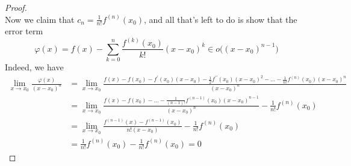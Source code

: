 \begin{proof}
\begin{equation}
    \end{equation}
    Now we claim that $c_n = \frac{1}{n!} f^{(n)} (x_0)$, and all that's left to do is show that the error term 
    \begin{equation}
      \varphi(x) = f(x) - \sum_{k=0}^{n} \frac{f^{(k)} (x_0)}{k!} (x - x_0)^k \in o \big( (x - x_0)^{n-1} \big)
    \end{equation}
    Indeed, we have 
    \begin{align}
      \lim_{x \to x_0} \frac{\varphi(x)}{(x - x_0)^n} & = \lim_{x \to x_0} \frac{f(x) - f(x_0) - f^\prime (x_0) (x - x_0) - \frac{1}{2} f^{\prime\prime} (x_0) (x - x_0)^2 - \ldots - \frac{1}{n!} f^{(n)} (x_0) (x - x_0)^n}{(x - x_0)^n}  \\ 
                                                      & = \lim_{x \to x_0} \frac{f(x) - f(x_0) - \ldots - \frac{1}{(n-1)!} f^{(n-1)} (x_0) (x - x_0)^{n-1}}{(x - x_0)^n} - \frac{1}{n!} f^{(n)} (x_0) \\ 
                                                      & = \lim_{x \to x_0} \frac{f^{(n-1)} (x) - f^{(n-1)} (x_0)}{n! (x - x_0)} - \frac{1}{n!} f^{(n)} (x_0) \\ 
                                                      & = \frac{1}{n!} f^{(n)} (x_0) - \frac{1}{n!} f^{(n)} (x_0) = 0
    \end{align}
  \end{proof}


